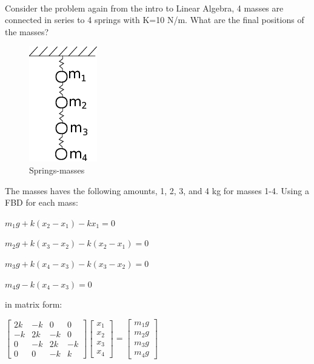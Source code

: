 \documentclass[11pt]{article}
\makeatletter
\def\maxwidth{\ifdim\Gin@nat@width>\linewidth\linewidth
    \else\Gin@nat@width\fi}
\let\Oldincludegraphics\includegraphics
\renewcommand{\includegraphics}[1]{\Oldincludegraphics[width=.8\maxwidth]{#1}}
\makeatother
\begin{document}
    \begin{center}
    \end{center}
    { \hspace*{\fill} \\}
    
    Consider the problem again from the intro to Linear Algebra, 4 masses
are connected in series to 4 springs with K=10 N/m. What are the final
positions of the masses?

\begin{figure}[htbp]
\centering
\includegraphics{mass_springs.png}
\caption{Springs-masses}
\end{figure}

The masses haves the following amounts, 1, 2, 3, and 4 kg for masses
1-4. Using a FBD for each mass:

\(m_{1}g+k(x_{2}-x_{1})-kx_{1}=0\)

\(m_{2}g+k(x_{3}-x_{2})-k(x_{2}-x_{1})=0\)

\(m_{3}g+k(x_{4}-x_{3})-k(x_{3}-x_{2})=0\)

\(m_{4}g-k(x_{4}-x_{3})=0\)

in matrix form:

\(\left[ \begin{array}{cccc} 2k & -k & 0 & 0 \\ -k & 2k & -k & 0 \\ 0 & -k & 2k & -k \\ 0 & 0 & -k & k \end{array} \right] \left[ \begin{array}{c} x_{1} \\ x_{2} \\ x_{3} \\ x_{4} \end{array} \right]= \left[ \begin{array}{c} m_{1}g \\ m_{2}g \\ m_{3}g \\ m_{4}g \end{array} \right]\)
\end{document}
